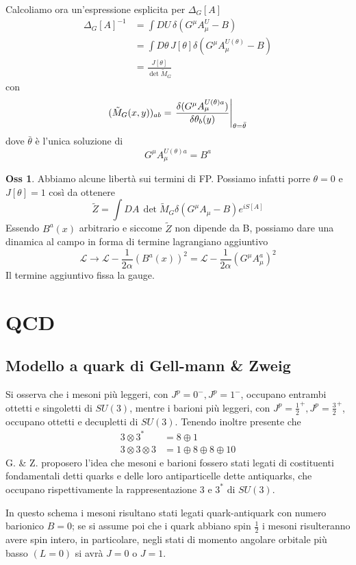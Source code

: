\documentclass[10pt,a4paper]{article}
\theoremstyle{definition}
\newtheorem{observation}{Oss}[section]
\newcommand{\lagr}{\mathcal{L}} %
\begin{document}
Calcoliamo ora un'espressione esplicita per $\Delta_G[A]$
\begin{align*}
    \Delta_G[A]^{-1} &= \int DU\, \delta(G^\mu A_\mu^U - B) \\
    &= \int D\theta\, J[\theta] \delta(G^\mu A_\mu^{U(\theta)} - B) \\
    &= \frac{J[\theta]}{\det \tilde{M}_G}
\end{align*}
con 
\[
(\tilde{M}_G(x, y))_{ab} = \eval{\fdv{(G^\mu A_\mu^{U(\theta)a})}{\theta_b(y)}}_{\theta = \bar{\theta}}    
\]
dove $\bar{\theta}$ è l'unica soluzione di 
\[
    G^\mu A_\mu^{U(\theta)a} = B^a
\]
\begin{observation}
    Abbiamo alcune libertà sui termini di FP. Possiamo infatti porre $\theta = 0$ e $J[\theta] = 1$ così da ottenere
    \[
    \tilde{Z} = \int DA\, \det \tilde{M}_G \delta(G^\mu A_\mu - B)e^{iS[A]}   
    \]
    Essendo $B^a(x)$ arbitrario e siccome $\tilde{Z}$ non dipende da B, possiamo dare una dinamica al campo in forma di termine lagrangiano aggiuntivo
    \[
    \lagr \to \lagr - \frac{1}{2\alpha}(B^a(x))^2 = \lagr - \frac{1}{2\alpha}(G^\mu A_\mu^a)^2      
    \]
    Il termine aggiuntivo fissa la gauge.
\end{observation}


\section{QCD}
\subsection{Modello a quark di Gell-mann \& Zweig}
Si osserva che i mesoni più leggeri, con \(J^p = 0^-, J^p = 1^-\), occupano entrambi ottetti e singoletti di \(SU(3)\), mentre i barioni più leggeri, con \(J^p = \frac12^+, J^p=\frac32^+\), occupano ottetti e decupletti di \(SU(3)\).
Tenendo inoltre presente che 
\begin{align*}
    3 \otimes 3^* &= 8 \oplus 1 \\
    3 \otimes 3 \otimes 3 &= 1 \oplus 8 \oplus 8 \oplus 10
\end{align*}
G. \& Z. proposero l'idea che mesoni e barioni fossero stati legati di costituenti fondamentali detti quarks e delle loro antiparticelle dette antiquarks, che occupano rispettivamente la rappresentazione \(3\) e \(3^*\) di \(SU(3)\).

In questo schema i mesoni risultano stati legati quark-antiquark con numero barionico \(B = 0\); se si assume poi che i quark abbiano spin \(\frac12\) i mesoni risulteranno avere spin intero, in particolare, negli stati di momento angolare orbitale più basso \((L = 0)\) si avrà \(J = 0\) o \(J = 1\).
\end{document}
